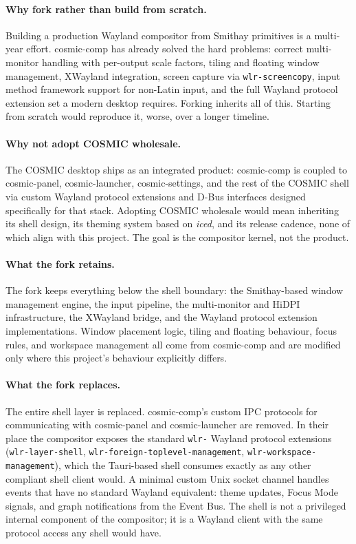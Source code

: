 \paragraph{Why fork rather than build from scratch.}
Building a production Wayland compositor from Smithay primitives is a
multi-year effort. cosmic-comp has already solved the hard problems: correct
multi-monitor handling with per-output scale factors, tiling and floating
window management, XWayland integration, screen capture via
\texttt{wlr-screencopy}, input method framework support for non-Latin input,
and the full Wayland protocol extension set a modern desktop requires. Forking
inherits all of this. Starting from scratch would reproduce it, worse, over a
longer timeline.

\paragraph{Why not adopt COSMIC wholesale.}
The COSMIC desktop ships as an integrated product: cosmic-comp is coupled to
cosmic-panel, cosmic-launcher, cosmic-settings, and the rest of the COSMIC
shell via custom Wayland protocol extensions and D-Bus interfaces designed
specifically for that stack. Adopting COSMIC wholesale would mean inheriting
its shell design, its theming system based on \emph{iced}, and its release
cadence, none of which align with this project. The goal is the compositor
kernel, not the product.

\paragraph{What the fork retains.}
The fork keeps everything below the shell boundary: the Smithay-based window
management engine, the input pipeline, the multi-monitor and HiDPI
infrastructure, the XWayland bridge, and the Wayland protocol extension
implementations. Window placement logic, tiling and floating behaviour, focus
rules, and workspace management all come from cosmic-comp and are modified
only where this project's behaviour explicitly differs.

\paragraph{What the fork replaces.}
The entire shell layer is replaced. cosmic-comp's custom IPC protocols for
communicating with cosmic-panel and cosmic-launcher are removed. In their
place the compositor exposes the standard \texttt{wlr-} Wayland protocol
extensions (\texttt{wlr-layer-shell}, \texttt{wlr-foreign-toplevel-management},
\texttt{wlr-workspace-management}), which the Tauri-based shell consumes
exactly as any other compliant shell client would. A minimal custom Unix
socket channel handles events that have no standard Wayland equivalent: theme
updates, Focus Mode signals, and graph notifications from the Event Bus.
The shell is not a privileged internal component of the compositor; it is a
Wayland client with the same protocol access any shell would have.

